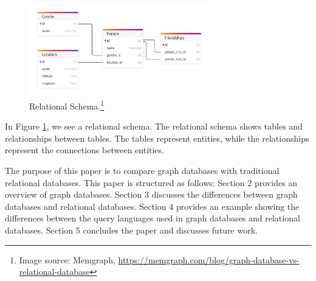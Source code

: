 \begin{figure}[h]
    \centering
    \includegraphics[width=0.7\textwidth]{assets/memgraph-relational-schema.png}
    \caption{Relational Schema.\protect\footnote{Image source: Memgraph, \url{https://memgraph.com/blog/graph-database-vs-relational-database}}}
    \label{fig:relational_schema}
\end{figure}
In Figure \ref{fig:relational_schema}, we see a relational schema. The relational schema shows tables and relationships between tables. The tables represent entities, while the relationships represent the connections between entities.

The purpose of this paper is to compare graph databases with traditional relational databases. This paper is structured as follows: Section 2 provides an overview of graph databases. Section 3 discusses the differences between graph databases and relational databases. Section 4 provides an example showing the differences between the query languages used in graph databases and relational databases. Section 5 concludes the paper and discusses future work.










